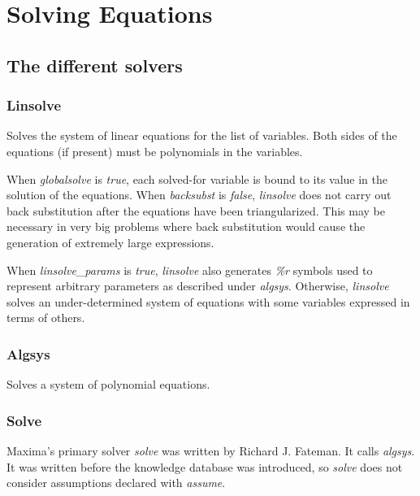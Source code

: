 \documentclass[../Maxima_Workbook.tex]{subfiles}
\begin{document}
	
\chapter{Solving Equations}

\section{The different solvers}

\subsection{Linsolve}

\lz {} \hfill \tcr{[function]}

\lz Solves the system of linear equations for the list of variables. Both sides of the equations (if present) must be polynomials in the variables.

\lz When \emph{globalsolve} is \emph{true}, each solved-for variable is bound to its value in the solution of the equations. When \emph{backsubst} is \emph{false}, \emph{linsolve} does not carry out back substitution after the equations have been triangularized. This may be necessary in very big problems where back substitution would cause the generation of extremely large expressions. 

\lz When \emph{linsolve\_params} is \emph{true}, \emph{linsolve} also generates \emph{\%r} symbols used to represent arbitrary parameters as described under \emph{algsys}. Otherwise, \emph{linsolve} solves an under-determined system of equations with some variables expressed in terms of others.

\subsection{Algsys}

Solves a system of polynomial equations. 

\subsection{Solve}

Maxima's primary solver \emph{solve} was written by Richard J. Fateman. It calls \emph{algsys}. It was written before the knowledge database was introduced, so \emph{solve} does not consider assumptions declared with \emph{assume}.
\end{document}
